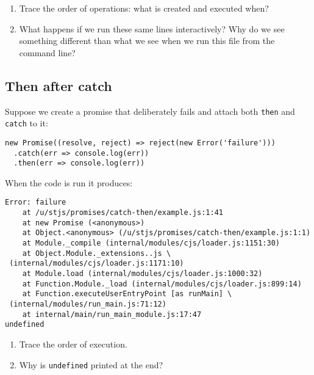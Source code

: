 \documentclass[krantzl]{krantz}
\begin{document}
\begin{enumerate}

\item Trace the order of operations: what is created and executed when?

\item What happens if we run these same lines interactively?
    Why do we see something different than what we see when we run this file from the command line?

\end{enumerate}

\subsection*{Then after catch}


Suppose we create a promise that deliberately fails
and attach both \texttt{then} and \texttt{catch} to it:


\begin{lstlisting}[frame=tblr]
new Promise((resolve, reject) => reject(new Error('failure')))
  .catch(err => console.log(err))
  .then(err => console.log(err))
\end{lstlisting}



\noindent When the code is run it produces:


\begin{lstlisting}[frame=tblr,backgroundcolor=\color{black!5}]
Error: failure
    at /u/stjs/promises/catch-then/example.js:1:41
    at new Promise (<anonymous>)
    at Object.<anonymous> (/u/stjs/promises/catch-then/example.js:1:1)
    at Module._compile (internal/modules/cjs/loader.js:1151:30)
    at Object.Module._extensions..js \
 (internal/modules/cjs/loader.js:1171:10)
    at Module.load (internal/modules/cjs/loader.js:1000:32)
    at Function.Module._load (internal/modules/cjs/loader.js:899:14)
    at Function.executeUserEntryPoint [as runMain] \
 (internal/modules/run_main.js:71:12)
    at internal/main/run_main_module.js:17:47
undefined
\end{lstlisting}


\begin{enumerate}

\item Trace the order of execution.

\item Why is \texttt{undefined} printed at the end?

\end{enumerate}
\end{document}

